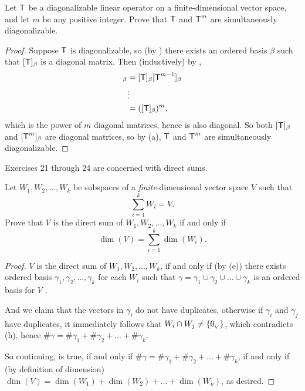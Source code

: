 \begin{exercise} \label{exercise 5.2.20}
Let \(\textsf{T}\) be a diagonalizable linear operator on a finite-dimensional vector space, and let \(m\) be any positive integer.
Prove that \(\textsf{T}\) and \(\textsf{T}^m\) are simultaneously diagonalizable.
\end{exercise}

\begin{proof}
Suppose \(\textsf{T}\) is diagonalizable, so (by ) there exists an ordered basis \(\beta\) such that \([\textsf{T}]_{\beta}\) is a diagonal matrix.
Then (inductively) by ,
\begin{align*}
    [\T^m]_{\beta} & = [\T]_{\beta} [\T^{m - 1}]_{\beta} \\
        & \vdots \\
        & = ([\T]_{\beta})^m,
\end{align*}
which is the power of \(m\) diagonal matrices, hence is also diagonal.
So both \([\textsf{T}]_{\beta}\) and \([\textsf{T}^m]_{\beta}\) are diagonal matrices, so by (a), \(\textsf{T}\) and \(\textsf{T}^m\) are simultaneously diagonalizable.
\end{proof}

Exercises 21 through 24 are concerned with direct sums.

\begin{exercise} \label{exercise 5.2.21}
Let \(W_1, W_2, ..., W_k\) be subspaces of a \emph{finite}-dimensional vector space \(V\) such that
\[
    \sum_{i = 1}^k W_i = V.
\]
Prove that \(V\) is the direct sum of \(W_1, W_2, ..., W_k\) if and only if
\[
    \dim(V) = \sum_{i = 1}^k \dim(W_i).
\]
\end{exercise}

\begin{proof}
\(V\) is the direct sum of \(W_1, W_2, ..., W_k\),
if and only if (by (e)) there exists ordered basis \(\gamma_1, \gamma_2, ..., \gamma_k\) for each \(W_i\) such that \(\gamma = \gamma_1 \cup \gamma_2 \cup ... \cup \gamma_k\) is an ordered basis for \(V\) .

And we claim that the vectors in \(\gamma_i\) do not have duplicates, otherwise if \(\gamma_i\) and \(\gamma_j\) have duplicates, it immediately follows that \(W_i \cap W_j \ne \{ 0_{_V} \}\), which contradicts (h), hence \(\#\gamma = \#\gamma_1 + \#\gamma_2 + ... + \#\gamma_k\).

So continuing,  is true, if and only if \(\#\gamma = \#\gamma_1 + \#\gamma_2 + ... + \#\gamma_k\),
if and only if (by definition of dimension) \(\dim(V) = \dim(W_1) + \dim(W_2) + ... + \dim(W_k)\), as desired.
\end{proof}

